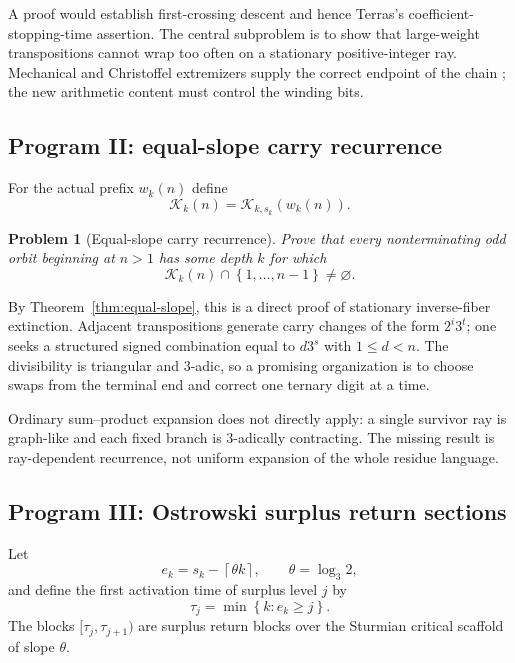 \documentclass[11pt,reqno]{amsart}
\numberwithin{equation}{section}
\newtheorem{problem}[theorem]{Problem}
\theoremstyle{definition}
\theoremstyle{remark}
\newcommand{\set}[1]{\left\{#1\right\}}
\newcommand{\ceil}[1]{\left\lceil #1\right\rceil}
\begin{document}
A proof would establish first-crossing descent and hence Terras's
coefficient-stopping-time assertion.  The central subproblem is to show that
large-weight transpositions cannot wrap too often on a stationary
positive-integer ray.  Mechanical and Christoffel extremizers supply the
correct endpoint of the chain \cite{FernandezIbanez2026}; the new arithmetic
content must control the winding bits.

\subsection{Program II: equal-slope carry recurrence}

For the actual prefix $w_k(n)$ define
\[
\mathcal K_k(n)=\mathcal K_{k,s_k}(w_k(n)).
\]

\begin{problem}[Equal-slope carry recurrence]\label{prob:equal-slope-recurrence}
Prove that every nonterminating odd orbit beginning at $n>1$ has some depth
$k$ for which
\begin{equation}\label{eq:equal-slope-recurrence}
\mathcal K_k(n)\cap\set{1,\ldots,n-1}\ne\varnothing.
\end{equation}
\end{problem}

By Theorem~\ref{thm:equal-slope}, this is a direct proof of stationary
inverse-fiber extinction.  Adjacent transpositions generate carry changes of
the form $2^i3^t$; one seeks a structured signed combination equal to
$d3^s$ with $1\le d<n$.  The divisibility is triangular and $3$-adic, so a
promising organization is to choose swaps from the terminal end and correct
one ternary digit at a time.

Ordinary sum--product expansion does not directly apply: a single survivor
ray is graph-like and each fixed branch is $3$-adically contracting.  The
missing result is ray-dependent recurrence, not uniform expansion of the
whole residue language.

\subsection{Program III: Ostrowski surplus return sections}

Let
\[
e_k=s_k-\ceil{\theta k},
\qquad \theta=\log_3 2,
\]
and define the first activation time of surplus level $j$ by
\begin{equation}\label{eq:tau-j}
\tau_j=\min\set{k:e_k\ge j}.
\end{equation}
The blocks $[\tau_j,\tau_{j+1})$ are surplus return blocks over the Sturmian
critical scaffold of slope $\theta$.
\end{document}
